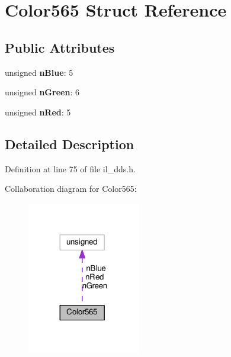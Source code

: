 \hypertarget{structColor565}{}\section{Color565 Struct Reference}
\label{structColor565}
\subsection*{Public Attributes}
\begin{DoxyCompactItemize}
\item 
\mbox{\label{structColor565_ab161b8bbeebeef7dae129499626dcca4}} 
unsigned {\bfseries n\+Blue}\+: 5
\item 
\mbox{\label{structColor565_a4bd24cf368bfb9afcc34be9b7ced3d9f}} 
unsigned {\bfseries n\+Green}\+: 6
\item 
\mbox{\label{structColor565_a1e8a07060938b9528e1b7d61966128e3}} 
unsigned {\bfseries n\+Red}\+: 5
\end{DoxyCompactItemize}


\subsection{Detailed Description}


Definition at line 75 of file il\+\_\+dds.\+h.



Collaboration diagram for Color565\+:
\nopagebreak
\begin{figure}[H]
\begin{center}
\leavevmode
\includegraphics[width=140pt]{d8/d70/structColor565__coll__graph}
\end{center}
\end{figure}


